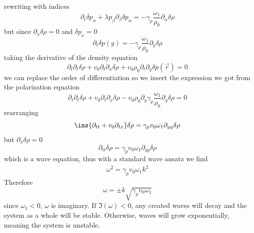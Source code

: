 rewriting with indices
\begin{equation}
	\partial_t \delta p_\alpha + \lambda p_\beta\partial_\beta \delta p_\alpha = -\gamma_p\frac{\omega_1}{\rho_0}\partial_\alpha\delta\rho
\end{equation}
but since \(\partial_x\delta\rho = 0\) and \(\delta p_x = 0\)
\begin{equation}
	\partial_t\delta p(y) = -\gamma_p\frac{\omega_1}{\rho_0}\partial_y\delta\rho
\end{equation}
taking the derivative of the density equation
\begin{equation}
	\partial_t\partial_t\delta \rho+v_0\partial_t\partial_x\delta \rho+v_0\rho_0\partial_t\partial_y\delta p(\vec{r})=0
\end{equation}
we can replace the order of differentiation so we insert the expression we got from the polarization equation
\begin{equation}
	\partial_t\partial_t\delta \rho+v_0\partial_t\partial_x\delta \rho-v_0\rho_0\partial_y\gamma_p\frac{\omega_1}{\rho_0}\partial_y\delta\rho=0
\end{equation}
rearranging
\begin{equation}
	\ins{\partial_{tt}+v_0\partial_{tx}}\delta\rho = \gamma_p v_0\omega_1\partial_{yy}\delta\rho
\end{equation}
but \(\partial_x\delta \rho = 0\)
\begin{equation}
	\partial_{tt}\delta\rho = \gamma_p v_0\omega_1\partial_{yy}\delta\rho
\end{equation}
which is a wave equation, thus with a standard wave ansatz we find
\begin{align}
	\omega^2 = \gamma_p v_0 \omega_1 k^2
\end{align}
Therefore
\begin{equation}
	\omega = \pm k\sqrt{\gamma_p v_0 \omega_1} 
\end{equation}
since \(\omega_1<0\), \(\omega\) is imaginary. If \(\Im(\omega)<0\), any created waves will decay and the system as a whole will be stable. Otherwise, waves will grow exponentially, meaning the system is unstable.
